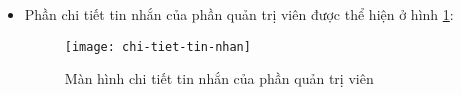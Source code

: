 \documentclass[../Thesis.tex]{subfiles}
\begin{document}
\begin{itemize}
                \item Phần chi tiết tin nhắn của phần quản trị viên được thể hiện ở hình \ref{fig:chi-tiet-tin-nhan}:
                \begin{figure}[hbt!]
                    \centering\texttt{[image: chi-tiet-tin-nhan]}
                    \caption{Màn hình chi tiết tin nhắn của phần quản trị viên}
                    \label{fig:chi-tiet-tin-nhan}
                \end{figure}
                \FloatBarrier
        \end{itemize}


    
\end{document}
